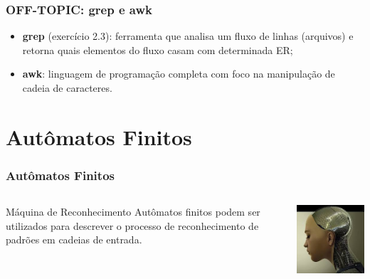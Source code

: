 \documentclass[table]{beamer}
\begin{document}
\begin{frame}
   \frametitle{OFF-TOPIC: grep e awk}
   \begin{itemize}
      \item \textbf{grep} (exercício 2.3): ferramenta que analisa um fluxo de linhas (arquivos) e retorna quais elementos do fluxo casam com determinada ER;
      \item \textbf{awk}: linguagem de programação completa com foco na manipulação de cadeia de caracteres.
   \end{itemize}
\end{frame}

\section{Autômatos Finitos}
\begin{frame}
   \frametitle{Autômatos Finitos}
   \begin{columns}
      \begin{column}{0.5\textwidth}
         \begin{block}{Máquina de Reconhecimento}
         Autômatos finitos podem ser utilizados para descrever o processo de reconhecimento de padrões em cadeias de entrada.
	 \end{block}
      \end{column}
      \begin{column}{0.5\textwidth}
         \includegraphics[width=\linewidth,height=\textheight,keepaspectratio]{figuras/automato.jpeg}
      \end{column}
   \end{columns}
\end{frame}
\end{document}
